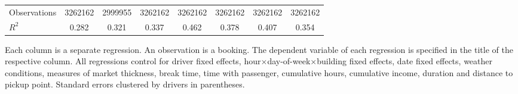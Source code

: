 \documentclass[reviewmode,AEJ]{AEA}
\begin{document}
\begin{table}[]
{\begin{tabularx}{\textwidth}{p{3.8cm}*{7}{S[table-format = 0.4, table-space-text-pre={**}, table-space-text-post={-**}]}}
        Observations        &\num{3262162}         &\num{2999955}         &\num{3262162}         &\num{3262162}         &\num{3262162}         &\num{3262162}         &\num{3262162}         \\
        \(R^2\)             & \num{0.282}         & \num{0.321}         & \num{0.337}         & \num{0.462}         & \num{0.378}         & \num{0.407}         & \num{0.354}         \\
        \bottomrule
		\end{tabularx}
		}
		\begin{tablenotes}
	    	\small
			Each column is a separate regression. An observation is a booking. The dependent variable of each regression is specified in the title of the respective column. All regressions control for driver fixed effects, hour\(\times\)day-of-week\(\times\)building fixed effects, date fixed effects, weather conditions, measures of market thickness, break time, time with passenger, cumulative hours, cumulative income, duration and distance to pickup point. Standard errors clustered by drivers in parentheses.%
		\end{tablenotes}
\end{table}


\clearpage



\FloatBarrier
\end{document}
